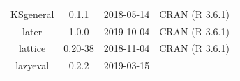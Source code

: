 \documentclass[11pt,]{book}
\begin{document}
\begin{longtable}[]{@{}cccc@{}}
\begin{minipage}[t]{0.18\columnwidth}\centering\strut
KSgeneral\strut
\end{minipage} & \begin{minipage}[t]{0.19\columnwidth}\centering\strut
0.1.1\strut
\end{minipage} & \begin{minipage}[t]{0.16\columnwidth}\centering\strut
2018-05-14\strut
\end{minipage} & \begin{minipage}[t]{0.36\columnwidth}\centering\strut
CRAN (R 3.6.1)\strut
\end{minipage}\tabularnewline
\begin{minipage}[t]{0.18\columnwidth}\centering\strut
later\strut
\end{minipage} & \begin{minipage}[t]{0.19\columnwidth}\centering\strut
1.0.0\strut
\end{minipage} & \begin{minipage}[t]{0.16\columnwidth}\centering\strut
2019-10-04\strut
\end{minipage} & \begin{minipage}[t]{0.36\columnwidth}\centering\strut
CRAN (R 3.6.1)\strut
\end{minipage}\tabularnewline
\begin{minipage}[t]{0.18\columnwidth}\centering\strut
lattice\strut
\end{minipage} & \begin{minipage}[t]{0.19\columnwidth}\centering\strut
0.20-38\strut
\end{minipage} & \begin{minipage}[t]{0.16\columnwidth}\centering\strut
2018-11-04\strut
\end{minipage} & \begin{minipage}[t]{0.36\columnwidth}\centering\strut
CRAN (R 3.6.1)\strut
\end{minipage}\tabularnewline
\begin{minipage}[t]{0.18\columnwidth}\centering\strut
lazyeval\strut
\end{minipage} & \begin{minipage}[t]{0.19\columnwidth}\centering\strut
0.2.2\strut
\end{minipage} & \begin{minipage}[t]{0.16\columnwidth}\centering\strut
2019-03-15\strut
\end{minipage} & \begin{minipage}[t]{0.36\columnwidth}\centering\strut

\end{minipage}
\end{longtable}
\end{document}
